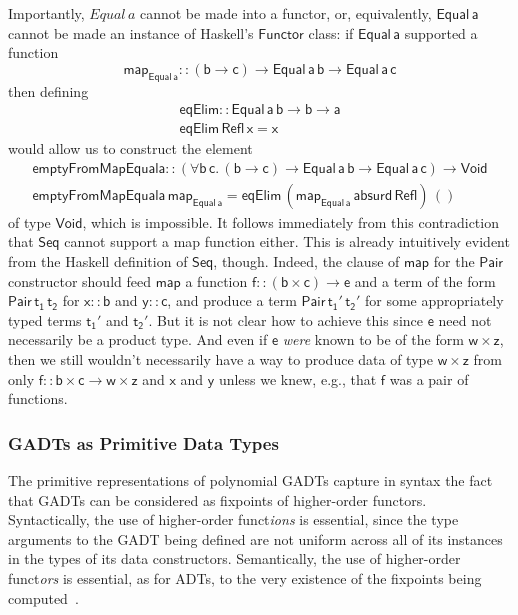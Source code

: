 \documentclass[acmsmall,screen,review,anonymous]{acmart}
\theoremstyle{definition}
\begin{document}
Importantly, $\mathit{Equal}\,a$ cannot be made into a functor, or,
equivalently, $\mathsf{Equal\,a}$ cannot be made an instance of
Haskell's $\mathsf{Functor}$ class: if $\mathsf{Equal\,a}$ supported a
function
\[\mathsf{map_{Equal\,a} :: (b \to c) \to Equal\,a\,b \to
  Equal\,a\,c}\]
then defining
\[\begin{array}{l}
\mathsf{eqElim :: Equal\, a\, b \to b \to a}\\
\mathsf{eqElim\, Refl\, x = x} 
\end{array}\]
would allow us to construct the element 
\[\begin{array}{l}
\mathsf{emptyFromMapEquala :: (\forall b\, c.\, (b \to c) \to Equal\, a\,
  b \to Equal\, a \,c) \to Void}\\ 
\mathsf{emptyFromMapEquala \,map_{Equal\,a} = eqElim\, (map_{Equal\,a}\,
  absurd\, Refl)\, ()}  
\end{array}\]
of type $\mathsf{Void}$, which is impossible. It follows immediately
from this contradiction that $\mathsf{Seq}$ cannot support a map
function either. This is already intuitively evident from the Haskell
definition of $\mathsf{Seq}$, though. Indeed, the clause of
$\mathsf{map}$ for the $\mathsf{Pair}$ constructor should feed
$\mathsf{map}$ a function $\mathsf{f :: (b \times c) \to e}$ and a
term of the form $\mathsf{Pair \,t_1\,t_2}$ for $\mathsf{x :: b}$ and
$\mathsf{y :: c}$, and produce a term $\mathsf{Pair\,t_1'\,t_2'}$ for
some appropriately typed terms $\mathsf{t_1'}$ and
$\mathsf{t_2'}$. But it is not clear how to achieve this since
$\mathsf{e}$ need not necessarily be a product type. And even if
$\mathsf{e}$ {\em were} known to be of the form $\mathsf{w \times z}$,
then we still wouldn't necessarily have a way to produce data of type
$\mathsf{w \times z}$ from only $\mathsf{f :: b \times c \to w \times
  z}$ and $\mathsf{x}$ and $\mathsf{y}$ unless we knew, e.g., that
$\mathsf{f}$ was a pair of functions.

\subsubsection{GADTs as Primitive Data Types}

The primitive representations of {\color{blue} polynomial} GADTs
capture in syntax the fact that GADTs can be considered as fixpoints
of higher-order functors. Syntactically, the use of higher-order
funct{\em ions} is essential, since the type arguments to the GADT
being defined are not uniform across all of its instances in the types
of its data constructors. Semantically, the use of higher-order
funct{\em ors} is essential, as for ADTs, to the very existence of the
fixpoints being computed~\cite{tfca}.
\end{document}
